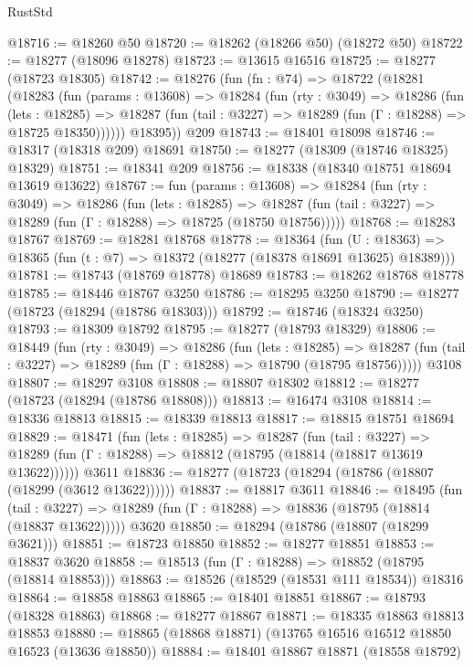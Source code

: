 \begin{lexlean}{RustStd}
\begin{coremodule}
@18716 := @18260 @50
@18720 := @18262 (@18266 @50) (@18272 @50)
@18722 := @18277 (@18096 @18278)
@18723 := @13615 @16516
@18725 := @18277 (@18723 @18305)
@18742 := @18276
    (fun (fn : @74) =>
    @18722
      (@18281
        (@18283
          (fun (params : @13608) =>
          @18284
            (fun (rty : @3049) =>
            @18286
              (fun (lets : @18285) =>
              @18287 (fun (tail : @3227) => @18289 (fun (Γ : @18288) => @18725 @18350))))))
        @18395))
    @209
@18743 := @18401 @18098
@18746 := @18317 (@18318 @209) @18691
@18750 := @18277 (@18309 (@18746 @18325) @18329)
@18751 := @18341 @209
@18756 := @18338 (@18340 @18751 @18694 @13619 @13622)
@18767 := fun (params : @13608) =>
  @18284
    (fun (rty : @3049) =>
    @18286
      (fun (lets : @18285) =>
      @18287 (fun (tail : @3227) => @18289 (fun (Γ : @18288) => @18725 (@18750 @18756)))))
@18768 := @18283 @18767
@18769 := @18281 @18768
@18778 := @18364
    (fun (U : @18363) => @18365 (fun (t : @7) => @18372 (@18277 (@18378 @18691 @13625) @18389)))
@18781 := @18743 (@18769 @18778) @18689
@18783 := @18262 @18768 @18778
@18785 := @18446 @18767 @3250
@18786 := @18295 @3250
@18790 := @18277 (@18723 (@18294 (@18786 @18303)))
@18792 := @18746 (@18324 @3250)
@18793 := @18309 @18792
@18795 := @18277 (@18793 @18329)
@18806 := @18449
    (fun (rty : @3049) =>
    @18286
      (fun (lets : @18285) =>
      @18287 (fun (tail : @3227) => @18289 (fun (Γ : @18288) => @18790 (@18795 @18756)))))
    @3108
@18807 := @18297 @3108
@18808 := @18807 @18302
@18812 := @18277 (@18723 (@18294 (@18786 @18808)))
@18813 := @16474 @3108
@18814 := @18336 @18813
@18815 := @18339 @18813
@18817 := @18815 @18751 @18694
@18829 := @18471
    (fun (lets : @18285) =>
    @18287
      (fun (tail : @3227) =>
      @18289 (fun (Γ : @18288) => @18812 (@18795 (@18814 (@18817 @13619 @13622))))))
    @3611
@18836 := @18277 (@18723 (@18294 (@18786 (@18807 (@18299 (@3612 @13622))))))
@18837 := @18817 @3611
@18846 := @18495
    (fun (tail : @3227) => @18289 (fun (Γ : @18288) => @18836 (@18795 (@18814 (@18837 @13622)))))
    @3620
@18850 := @18294 (@18786 (@18807 (@18299 @3621)))
@18851 := @18723 @18850
@18852 := @18277 @18851
@18853 := @18837 @3620
@18858 := @18513 (fun (Γ : @18288) => @18852 (@18795 (@18814 @18853)))
@18863 := @18526 (@18529 (@18531 @111 @18534)) @18316
@18864 := @18858 @18863
@18865 := @18401 @18851
@18867 := @18793 (@18328 @18863)
@18868 := @18277 @18867
@18871 := @18335 @18863 @18813 @18853
@18880 := @18865 (@18868 @18871) (@13765 @16516 @16512 @18850 @16523 (@13636 @18850))
@18884 := @18401 @18867 @18871 (@18558 @18792)

\end{coremodule}
\end{lexlean}
